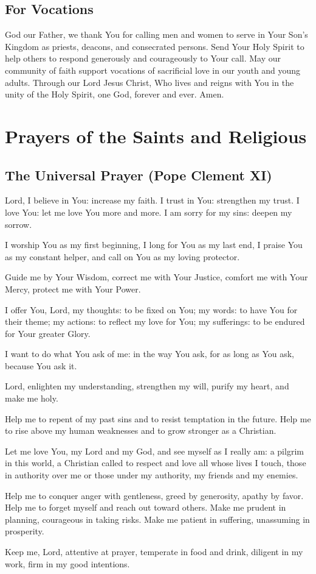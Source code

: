 \documentclass[12pt]{article}
\newcommand{\prayersection}[1]{\section{#1}}
\newcommand{\prayertitle}[1]{\subsection{#1}}
\begin{document}
\prayertitle{For Vocations}
God our Father, we thank You for calling men and women to serve in Your Son's Kingdom as priests, deacons, and consecrated persons.
Send Your Holy Spirit to help others to respond generously and courageously to Your call.
May our community of faith support vocations of sacrificial love in our youth and young adults.
Through our Lord Jesus Christ, Who lives and reigns with You in the unity of the Holy
Spirit, one God, forever and ever.
Amen.

\newpage

\prayersection{Prayers of the Saints and Religious}
\prayertitle{The Universal Prayer (Pope Clement XI)}
Lord, I believe in You: increase my faith.
I  trust in You: strengthen my trust.
I love You: let me love You more and more.
I am sorry for my sins: deepen my sorrow.

I worship You as my first beginning, I long for You as my last end, I praise You as my constant helper, and call on You as my loving protector.

Guide me by Your Wisdom,
correct me with Your Justice,
comfort me with Your Mercy,
protect me with Your Power.

I offer You, Lord, my thoughts: to be fixed on You;
my words: to have You for their theme;
my actions: to reflect my love for You;
my sufferings: to be endured for Your greater Glory.

I want to do what You ask of me:
in the way You ask,
for as long as You ask,
because You ask it.

Lord, enlighten my understanding,
strengthen my will,
purify my heart,
and make me holy.

Help me to repent of my past sins and to resist temptation in the future.
Help me to rise above my human weaknesses and to grow stronger as a Christian.

Let me love You, my Lord and my God, and see myself as I really am:
a pilgrim in this world,
a Christian called to respect and love all whose lives I touch,
those in authority over me or those under my authority,
my friends and my enemies.

Help me to conquer anger with gentleness,
greed by generosity,
apathy by favor.
Help me to forget myself and reach out toward others.
Make me prudent in planning, courageous in taking risks.
Make me patient in suffering, unassuming in prosperity.

Keep me, Lord, attentive at prayer,
temperate in food and drink,
diligent in my work,
firm in my good intentions.
\end{document}

